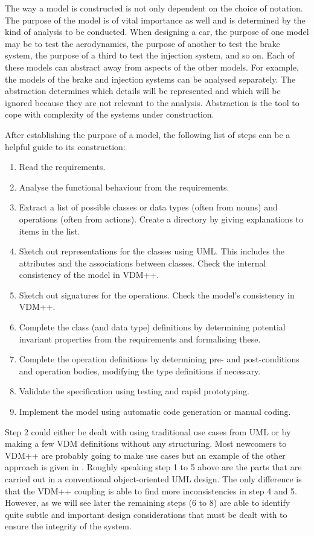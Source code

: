 \documentclass[\pformat,12pt,twoside]{article}
\begin{document}
The way a model is constructed is not only dependent on the choice 
of notation. The purpose of the model is of vital importance 
as well and is determined by the kind of analysis to be conducted. 
When designing a car, the purpose of one model may be to test 
the aerodynamics, the purpose of another to test the brake system, 
the purpose of a third to test the injection system, and so on. 
Each of these models can abstract away from aspects of the other 
models. For example, the models of the brake and injection systems 
can be analysed separately. The abstraction determines which 
details will be represented and which will be ignored because 
they are not relevant to the analysis. Abstraction is the tool 
to cope with complexity of the systems under construction.

After establishing the purpose of a model, the following list 
of steps can be a helpful guide to its construction:

\begin{enumerate}
\item Read the requirements.
\item Analyse the functional behaviour from the requirements.
\item Extract a list of possible classes or data types (often from 
nouns) and operations (often from actions). Create a directory 
by giving explanations to items in the list.
\item Sketch out representations for the classes using UML. This includes 
the attributes and the associations between classes. Check the 
internal consistency of the model in VDM++.
\item 
Sketch out signatures for the operations. Check the model's consistency 
in VDM++.
\item Complete the class (and data type) definitions by determining 
potential invariant properties from the requirements and formalising 
these.
\item Complete the operation definitions by determining pre- and post-conditions 
and operation bodies, modifying the type definitions if necessary.
\item Validate the specification using testing and rapid prototyping.
\item Implement the model using automatic code generation or manual 
coding.
\end{enumerate}

Step 2 could either be dealt with using traditional use cases from UML
or by making a few VDM definitions without any structuring. Most
newcomers to VDM++ are probably going to make use cases but an
example of the other approach is given in \cite{CashPoint}.
Roughly speaking step 1 to 5 above are the parts that are carried 
out in a conventional object-oriented UML design. The only difference 
is that the VDM++ coupling is able to find more inconsistencies 
in step 4 and 5. However, as we will see later the remaining 
steps (6 to 8) are able to identify quite subtle and important 
design considerations that must be dealt with to ensure the integrity 
of the system.
\end{document}
